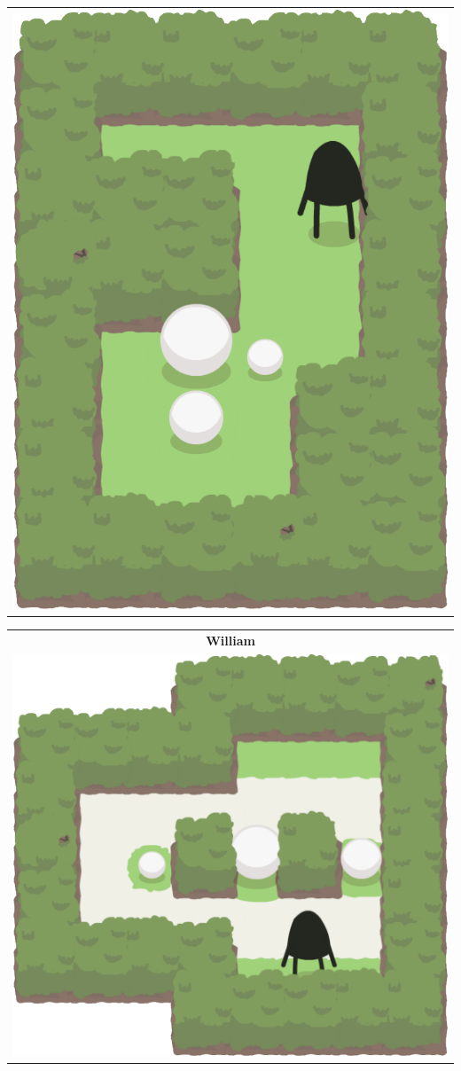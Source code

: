 \documentclass{report}
\theoremstyle{plain}
\begin{document}
\begin{center}
\begin{tabular}{c}
\includegraphics[scale=\levelAnnexWidth]{rebecca-1.png}
\end{tabular}
\begin{tabular}{c}
\textbf{William} \\
\includegraphics[scale=\levelAnnexWidth]{william-1.png}

\end{tabular}
\end{center}
\end{document}
